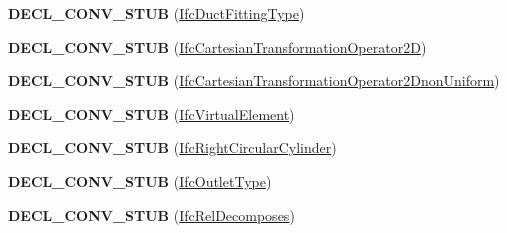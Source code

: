 \begin{DoxyCompactItemize}
\item 
\hypertarget{namespace_assimp_1_1_s_t_e_p_a60fee2df9275c598187dac5e85bee002}{{\bfseries D\+E\+C\+L\+\_\+\+C\+O\+N\+V\+\_\+\+S\+T\+U\+B} (\hyperlink{struct_assimp_1_1_i_f_c_1_1_ifc_duct_fitting_type}{Ifc\+Duct\+Fitting\+Type})}\label{namespace_assimp_1_1_s_t_e_p_a60fee2df9275c598187dac5e85bee002}

\item 
\hypertarget{namespace_assimp_1_1_s_t_e_p_ad2f51115789c42dd02a1d8850d612c5e}{{\bfseries D\+E\+C\+L\+\_\+\+C\+O\+N\+V\+\_\+\+S\+T\+U\+B} (\hyperlink{struct_assimp_1_1_i_f_c_1_1_ifc_cartesian_transformation_operator2_d}{Ifc\+Cartesian\+Transformation\+Operator2\+D})}\label{namespace_assimp_1_1_s_t_e_p_ad2f51115789c42dd02a1d8850d612c5e}

\item 
\hypertarget{namespace_assimp_1_1_s_t_e_p_a3a5294c7b0505854b930f4b213825e9c}{{\bfseries D\+E\+C\+L\+\_\+\+C\+O\+N\+V\+\_\+\+S\+T\+U\+B} (\hyperlink{struct_assimp_1_1_i_f_c_1_1_ifc_cartesian_transformation_operator2_dnon_uniform}{Ifc\+Cartesian\+Transformation\+Operator2\+Dnon\+Uniform})}\label{namespace_assimp_1_1_s_t_e_p_a3a5294c7b0505854b930f4b213825e9c}

\item 
\hypertarget{namespace_assimp_1_1_s_t_e_p_a1c712ebc4c564464d24cdfe4da887cda}{{\bfseries D\+E\+C\+L\+\_\+\+C\+O\+N\+V\+\_\+\+S\+T\+U\+B} (\hyperlink{struct_assimp_1_1_i_f_c_1_1_ifc_virtual_element}{Ifc\+Virtual\+Element})}\label{namespace_assimp_1_1_s_t_e_p_a1c712ebc4c564464d24cdfe4da887cda}

\item 
\hypertarget{namespace_assimp_1_1_s_t_e_p_a404ff0e9703157b823f41bdd0c3730ea}{{\bfseries D\+E\+C\+L\+\_\+\+C\+O\+N\+V\+\_\+\+S\+T\+U\+B} (\hyperlink{struct_assimp_1_1_i_f_c_1_1_ifc_right_circular_cylinder}{Ifc\+Right\+Circular\+Cylinder})}\label{namespace_assimp_1_1_s_t_e_p_a404ff0e9703157b823f41bdd0c3730ea}

\item 
\hypertarget{namespace_assimp_1_1_s_t_e_p_a7e3a42ac5ff4ec08ac421564136a3932}{{\bfseries D\+E\+C\+L\+\_\+\+C\+O\+N\+V\+\_\+\+S\+T\+U\+B} (\hyperlink{struct_assimp_1_1_i_f_c_1_1_ifc_outlet_type}{Ifc\+Outlet\+Type})}\label{namespace_assimp_1_1_s_t_e_p_a7e3a42ac5ff4ec08ac421564136a3932}

\item 
\hypertarget{namespace_assimp_1_1_s_t_e_p_a793d8ecef407080607cfed492dea9922}{{\bfseries D\+E\+C\+L\+\_\+\+C\+O\+N\+V\+\_\+\+S\+T\+U\+B} (\hyperlink{struct_assimp_1_1_i_f_c_1_1_ifc_rel_decomposes}{Ifc\+Rel\+Decomposes})}\label{namespace_assimp_1_1_s_t_e_p_a793d8ecef407080607cfed492dea9922}


\end{DoxyCompactItemize}
